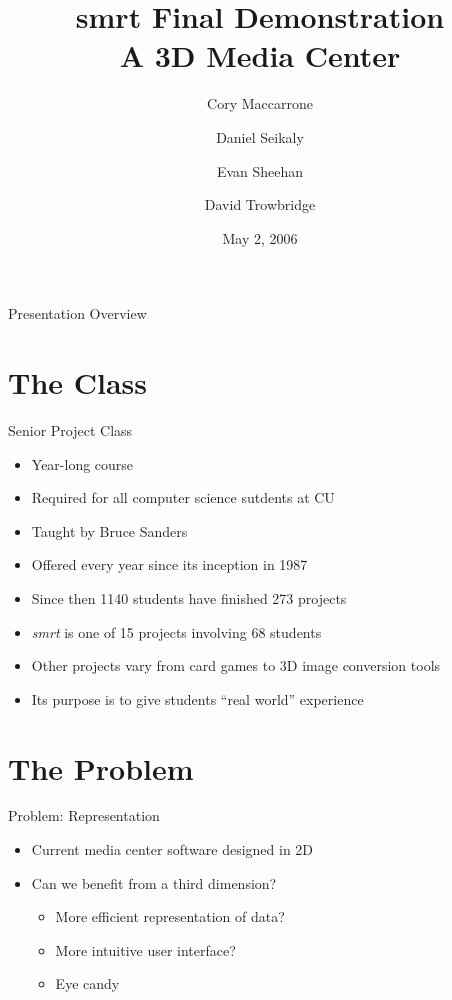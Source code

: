 \documentclass[style=smrt,mode=present,paper=screen]{powerdot}
\title{\huge{\textbf{smrt Final Demonstration}} \\ \small{A 3D Media Center}}
\author {
	Cory Maccarrone
	\and
	Daniel Seikaly
	\and
	Evan Sheehan
	\and
	David Trowbridge
}
\date{May 2, 2006}
\begin{document}
\maketitle


\begin{slide}[toc=,bm=]{Presentation Overview}
{\footnotesize \tableofcontents[content=all]}
\end{slide}


\section[slide=false]{The Class}
\begin{slide}{Senior Project Class}
\begin{itemize}
\item Year-long course
\item Required for all computer science sutdents at CU
\item Taught by Bruce Sanders
\item Offered every year since its inception in 1987
\item Since then 1140 students have finished 273 projects
\item \textit{smrt} is one of 15 projects involving 68 students
\item Other projects vary from card games to 3D image conversion tools
\item Its purpose is to give students ``real world'' experience
\end{itemize}
\end{slide}

\section[slide=false]{The Problem}
\begin{slide}[toc=,bm=]{Problem: Representation}
\begin{itemize}
\item Current media center software designed in 2D \\
\item Can we benefit from a third dimension? \\
\begin{itemize}
	\item More efficient representation of data? \\
	\item More intuitive user interface? \\
	\item Eye candy
\end{itemize}
\end{itemize}
\end{slide}
\end{document}
